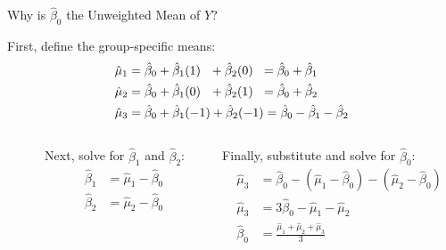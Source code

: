 \documentclass{beamer}\usepackage[]{graphicx}\usepackage[]{color}
\begin{document}
\watermarkon %

\begin{frame}{Why is $\hat{\beta}_0$ the Unweighted Mean of $Y$?}
  
  First, define the group-specific means:
  \begin{align*}
    \hat{\mu}_1 &= \hat{\beta}_0 + \hat{\beta}_1 (1) \text{\hspace{7pt}} + 
    \hat{\beta}_2 (0) \text{\hspace{6pt}} = \hat{\beta}_0 + \hat{\beta}_1\\
    \hat{\mu}_2 &= \hat{\beta}_0 + \hat{\beta}_1 (0) \text{\hspace{7pt}} + 
    \hat{\beta}_2 (1) \text{\hspace{6pt}} = \hat{\beta}_0 + \hat{\beta}_2\\
    \hat{\mu}_3 &= \hat{\beta}_0 + \hat{\beta}_1 (-1) + \hat{\beta}_2 (-1) = 
    \hat{\beta}_0 - \hat{\beta}_1 - \hat{\beta}_2
  \end{align*}

  \pause
  
  \begin{columns}[T]
    \begin{column}{0.01\textwidth}
    \end{column}
    
    \begin{column}{0.44\textwidth}
      Next, solve for $\hat{\beta}_1$ and $\hat{\beta}_2$:
      \begin{align*}
        \hat{\beta}_1 &= \hat{\mu}_1 - \hat{\beta}_0\\
        \hat{\beta}_2 &= \hat{\mu}_2 - \hat{\beta}_0\\
      \end{align*}
    \end{column}
  
    \pause
    
    \begin{column}{0.55\textwidth}
      Finally, substitute and solve for $\hat{\beta}_0$:
      \begin{align*}
        \hat{\mu}_3 &= \hat{\beta}_0 - (\hat{\mu}_1 - \hat{\beta}_0) - (\hat{\mu}_2 - \hat{\beta}_0)\\
        \hat{\mu}_3 &= 3\hat{\beta}_0 - \hat{\mu}_1 - \hat{\mu}_2\\
        \hat{\beta}_0 &= \frac{\hat{\mu}_1 + \hat{\mu}_2 + \hat{\mu}_3}{3}
      \end{align*}
    \end{column}
  \end{columns}
  
\end{frame}
\end{document}
